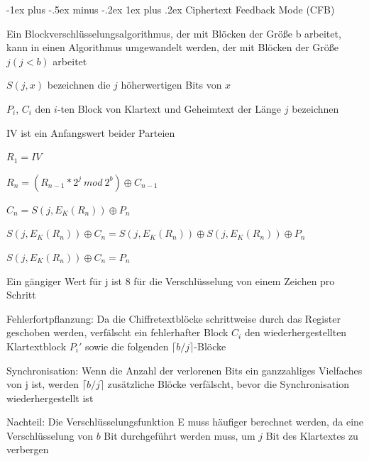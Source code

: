 \documentclass[a4paper]{article}
\makeatletter
\renewcommand{\subsubsection}{\@startsection{subsubsection}{3}{0mm}%
 {-1ex plus -.5ex minus -.2ex}%
 {1ex plus .2ex}%
 {\normalfont\small\bfseries}}
\makeatother
\begin{document}
\begin{multicols}{3}
      \subsubsection{Ciphertext Feedback Mode (CFB)}
      \begin{itemize*}
            \item Ein Blockverschlüsselungsalgorithmus, der mit Blöcken der Größe b arbeitet, kann in einen Algorithmus umgewandelt werden, der mit Blöcken der Größe $j (j<b)$ arbeitet
            \begin{itemize*}
                  \item $S(j, x)$ bezeichnen die $j$ höherwertigen Bits von $x$
                  \item $P_i$, $C_i$ den $i$-ten Block von Klartext und Geheimtext der Länge $j$ bezeichnen
                  \item IV ist ein Anfangswert beider Parteien
                  \item $R_1 = IV$
                  \item $R_n = (R_{n-1}*2^j\ mod\ 2^b)\oplus C_{n-1}$
                  \item $C_n = S(j,E_K(R_n))\oplus P_n$
                  \item $S(j,E_K(R_n))\oplus C_n = S(j,E_K(R_n))\oplus S(j,E_K(R_n))\oplus P_n$
                  \item $S(j,E_K(R_n))\oplus C_n = P_n$
            \end{itemize*}
            \item Ein gängiger Wert für j ist 8 für die Verschlüsselung von einem Zeichen pro Schritt
            \item Fehlerfortpflanzung: Da die Chiffretextblöcke schrittweise durch das Register geschoben werden, verfälscht ein fehlerhafter Block $C_i$ den wiederhergestellten Klartextblock $P_i'$ sowie die folgenden $\lceil b / j\rceil$-Blöcke
            \item Synchronisation: Wenn die Anzahl der verlorenen Bits ein ganzzahliges Vielfaches von j ist, werden $\lceil b / j\rceil$ zusätzliche Blöcke verfälscht, bevor die Synchronisation wiederhergestellt ist%
            \item Nachteil: Die Verschlüsselungsfunktion E muss häufiger berechnet werden, da eine Verschlüsselung von $b$ Bit durchgeführt werden muss, um $j$ Bit des Klartextes zu verbergen
      \end{itemize*}


\end{multicols}
\end{document}

